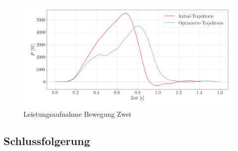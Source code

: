 \begin{figure}[tbph]
	\centering
	\includegraphics[width=1\linewidth]{images/P_up}
	\caption{Leistungsaufnahme Bewegung Zwei}
	\label{fig:pup}
\end{figure}

\subsection{Schlussfolgerung} 

%

